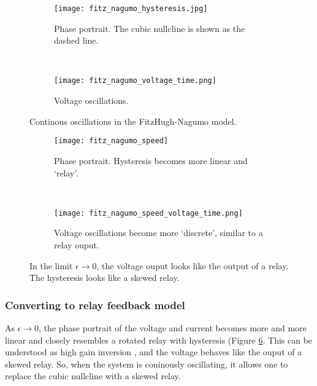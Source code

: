 \documentclass[a4paper, 12pt]{article}
\begin{document}
\begin{figure}
\centering
    \begin{subfigure}[b]{0.45\textwidth}
        \texttt{[image: fitz\_nagumo\_hysteresis.jpg]}
        \caption{Phase portrait. The cubic nullcline is shown as the dashed line.}
        \label{fig:FN_intro_hysteresis}
    \end{subfigure}
    ~ %
    \begin{subfigure}[b]{0.45\textwidth}
        \texttt{[image: fitz\_nagumo\_voltage\_time.png]}
        \caption{Voltage oscillations.}
        \label{fig:FN_intro_voltage}
    \end{subfigure}
    \caption{Continous oscillations in the FitzHugh-Nagumo model.}
    \label{fig:FN_intro}
\end{figure}

\begin{figure}
\centering
    \begin{subfigure}[b]{0.45\textwidth}
        \texttt{[image: fitz\_nagumo\_speed]}
        \caption{Phase portrait. Hysteresis becomes more linear and `relay'.}
        \label{fig:FN_eps_hysteresis}
    \end{subfigure}
    ~ %
    \begin{subfigure}[b]{0.45\textwidth}
        \texttt{[image: fitz\_nagumo\_speed\_voltage\_time.png]}
        \caption{Voltage oscillations become more `discrete', similar to a relay ouput.}
        \label{fig:FN_eps_voltage}
    \end{subfigure}
    \caption{In the limit $\epsilon\rightarrow0$, the voltage ouput looks like the output of a relay. The hysteresis looks like a skewed relay. }
    \label{fig:FN_eps_zero}
\end{figure}

\subsubsection{Converting to relay feedback model}\label{sec:FN_to_relay}

As $\epsilon\rightarrow 0$, the phase portrait of the voltage and current becomes more and more linear and closely resembles a rotated relay with hysteresis (Figure \ref{fig:FN_eps_zero}. This can be understood as  high gain inversion \cite{goodwin}, and the voltage behaves like the ouput of a skewed relay. So, when the system is coninously oscillating, it allows one to replace the cubic nullcline with a skewed relay. 
\end{document}
